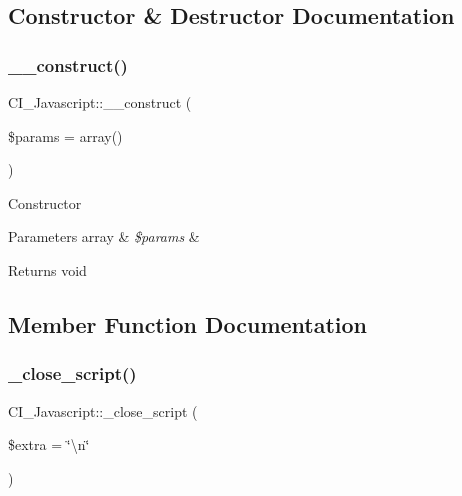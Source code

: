 \subsection{Constructor \& Destructor Documentation}
\mbox{\label{class_c_i___javascript_a7e5e24c19109d6c54be7fe79accffbc3}} 
\subsubsection{\texorpdfstring{\+\_\+\+\_\+construct()}{\_\_construct()}}
{\footnotesize\ttfamily C\+I\+\_\+\+Javascript\+::\+\_\+\+\_\+construct (\begin{DoxyParamCaption}\item[{}]{\$params = {\ttfamily array()} }\end{DoxyParamCaption})}

Constructor


\begin{DoxyParams}[1]{Parameters}
array & {\em \$params} & \\
\hline
\end{DoxyParams}
\begin{DoxyReturn}{Returns}
void 
\end{DoxyReturn}


\subsection{Member Function Documentation}
\mbox{\label{class_c_i___javascript_a832d6a934327dd68ab2d46004702df82}} 
\subsubsection{\texorpdfstring{\+\_\+close\+\_\+script()}{\_close\_script()}}
{\footnotesize\ttfamily C\+I\+\_\+\+Javascript\+::\+\_\+close\+\_\+script (\begin{DoxyParamCaption}\item[{}]{\$extra = {\ttfamily \char`\"{}\textbackslash{}n\char`\"{}} }\end{DoxyParamCaption})\hspace{0.3cm}{\ttfamily [protected]}}

